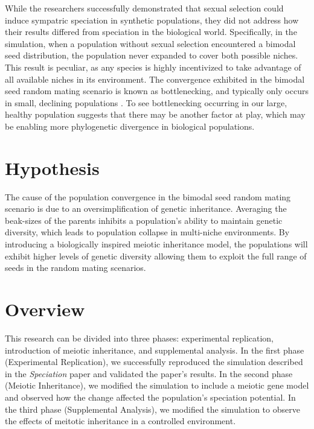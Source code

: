 \documentclass[conference]{IEEEtran}
\begin{document}
While the researchers successfully demonstrated that sexual selection could induce sympatric speciation in synthetic populations, they did not address how their results differed from speciation in the biological world. Specifically, in the simulation, when a population without sexual selection encountered a bimodal seed distribution, the population never expanded to cover both possible niches. This result is peculiar, as any species is highly incentivized to take advantage of all available niches in its environment. The convergence exhibited in the bimodal seed random mating scenario is known as bottlenecking, and typically only occurs in small, declining populations \cite{CHICKEN}. To see bottlenecking occurring in our large, healthy population suggests that there may be another factor at play, which may be enabling more phylogenetic divergence in biological populations.

\section{Hypothesis}

The cause of the population convergence in the bimodal seed random mating scenario is due to an oversimplification of genetic inheritance. Averaging the beak-sizes of the parents inhibits a population’s ability to maintain genetic diversity, which leads to population collapse in multi-niche environments. By introducing a biologically inspired meiotic inheritance model, the populations will exhibit higher levels of genetic diversity allowing them to exploit the full range of seeds in the random mating scenarios. 



\section{Overview}

This research can be divided into three phases: experimental replication, introduction of meiotic inheritance, and supplemental analysis. In the first phase (Experimental Replication), we successfully reproduced the simulation described in the \textit{Speciation} paper and validated the paper's results. In the second phase (Meiotic Inheritance), we modified the simulation to include a meiotic gene model and observed how the change affected the population's speciation potential. In the third phase (Supplemental Analysis), we modified the simulation to observe the effects of meitotic inheritance in a controlled environment. 
\end{document}
